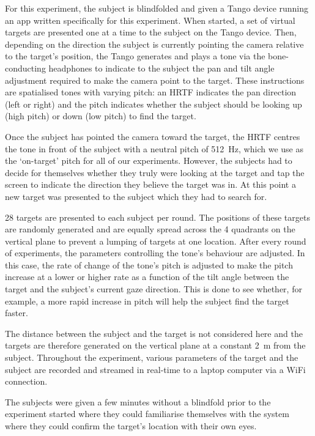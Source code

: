 \documentclass[format=sigconf, review=true, screen=true, anonymous=true]{acmart}
\begin{document}
For this experiment, the subject is blindfolded and given a Tango device running an app written specifically for this experiment. When started, a set of virtual targets are presented one at a time to the subject on the Tango device. Then, depending on the direction the subject is currently pointing the camera relative to the target's position, the Tango generates and plays a tone via the bone-conducting headphones to indicate to the subject the pan and tilt angle adjustment required to make the camera point to the target. These instructions are spatialised tones with varying pitch: an HRTF indicates the pan direction (left or right) and the pitch indicates whether the subject should be looking up (high pitch) or down (low pitch) to find the target. 

Once the subject has pointed the camera toward the target, the HRTF centres the tone in front of the subject with a neutral pitch of \SI{512}{\hertz}, which we use as the `on-target' pitch for all of our experiments.  However, the subjects had to decide for themselves whether they truly were looking at the target and tap the screen to indicate the direction they believe the target was in. At this point a new target was presented to the subject which they had to search for. 

28 targets are presented to each subject per round. The positions of these targets are randomly generated and are equally spread across the 4 quadrants on the vertical plane to prevent a lumping of targets at one location. After every round of experiments, the parameters controlling the tone's behaviour are adjusted. In this case, the rate of change of the tone's pitch is adjusted to make the pitch increase at a lower or higher rate as a function of the tilt angle between the target and the subject's current gaze direction. This is done to see whether, for example, a more rapid increase in pitch will help the subject find the target faster. 

The distance between the subject and the target is not considered here and the targets are therefore generated on the vertical plane at a constant \SI{2}{\meter} from the subject. Throughout the experiment, various parameters of the target and the subject are recorded and streamed in real-time to a laptop computer via a WiFi connection.

The subjects were given a few minutes without a blindfold prior to the experiment started where they could familiarise themselves with the system where they could confirm the target's location with their own eyes.
\end{document}
